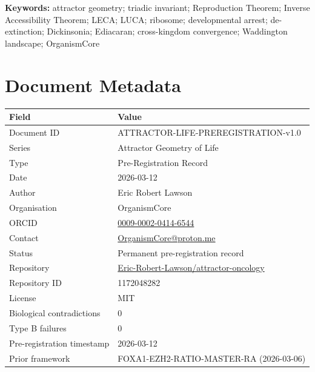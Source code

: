 \documentclass[12pt, a4paper]{article}
\theoremstyle{definition}
\theoremstyle{remark}
\begin{document}
\vspace{0.5em}
\noindent\textbf{Keywords:}
attractor geometry; triadic invariant; Reproduction Theorem;
Inverse Accessibility Theorem; LECA; LUCA; ribosome;
developmental arrest; de-extinction; Dickinsonia; Ediacaran;
cross-kingdom convergence; Waddington landscape; OrganismCore

\newpage
\tableofcontents
\newpage

\section{Document Metadata}

\begin{center}
\begin{tabular}{ll}
\toprule
\textbf{Field} & \textbf{Value} \\
\midrule
Document ID       & ATTRACTOR-LIFE-PREREGISTRATION-v1.0 \\
Series            & Attractor Geometry of Life \\
Type              & Pre-Registration Record \\
Date              & 2026-03-12 \\
Author            & Eric Robert Lawson \\
Organisation      & OrganismCore \\
ORCID             &
  \href{https://orcid.org/0009-0002-0414-6544}
       {0009-0002-0414-6544} \\
Contact           &
  \href{mailto:OrganismCore@proton.me}
       {OrganismCore@proton.me} \\
Status            & Permanent pre-registration record \\
Repository        &
  \href{https://github.com/Eric-Robert-Lawson/attractor-oncology}
       {Eric-Robert-Lawson/attractor-oncology} \\
Repository ID     & 1172048282 \\
License           & MIT \\
Biological contradictions & 0 \\
Type B failures   & 0 \\
Pre-registration timestamp & 2026-03-12 \\
Prior framework   & FOXA1-EZH2-RATIO-MASTER-RA (2026-03-06) \\
\bottomrule
\end{tabular}
\end{center}
\end{document}
